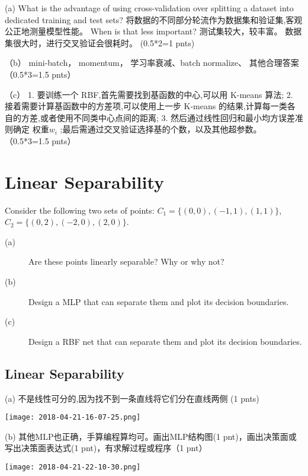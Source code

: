 \documentclass[12pt]{article}
\begin{document}
(a)  What is the advantage of using cross-validation over splitting a dataset into
dedicated training and test sets?  将数据的不同部分轮流作为数据集和验证集,客观公正地测量模型性能。
When is that less important? 测试集较大，较丰富。 数据集很大时，进行交叉验证会很耗时。 (0.5*2=1 pnts)

（b） mini-batch， momentum， 学习率衰减、batch normalize、 其他合理答案 （0.5*3=1.5 pnts）

（c） 1. 要训练一个 RBF,首先需要找到基函数的中心,可以用 K-means
算法;
2. 接着需要计算基函数中的方差项,可以使用上一步 K-means 的结果,计算每一类各
自的方差,或者使用不同类中心点间的距离;
3. 然后通过线性回归和最小均方误差准则确定
权重$w_i$ ;最后需通过交叉验证选择基的个数，以及其他超参数。 （0.5*3=1.5 pnts）

\section{Linear Separability}

Consider the following two sets of points: \(C_1 = \{ (0,0), (-1,1),(1,1) \} \), \(C_2 = \{ (0,2 ), (-2,0), (2,0)\}\).

\begin{description}
	\item[(a)] Are these points linearly separable? Why or why not?
	\item[(b)] Design a MLP that can separate them and plot its decision boundaries.
	\item[(c)] Design a RBF net that can separate them and plot its decision boundaries.
\end{description}

\subsection{Linear Separability} 

(a) 不是线性可分的,因为找不到一条直线将它们分在直线两侧 (1 pnts)

\begin{center}
	\texttt{[image: 2018-04-21-16-07-25.png]}
\end{center}

(b) 其他MLP也正确，手算编程算均可。画出MLP结构图(1 pnt)，画出决策面或写出决策面表达式(1 pnt)，有求解过程或程序（1 pnt）

\begin{center}
	\texttt{[image: 2018-04-21-22-10-30.png]}
\end{center}
\end{document}
